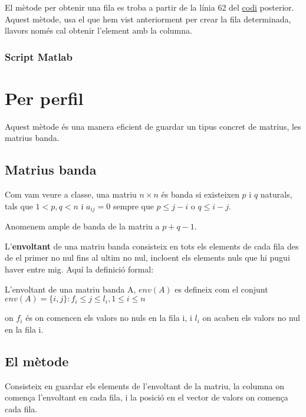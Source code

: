 \documentclass[11pt,a4paper,twoside]{report}
\begin{document}
	El mètode per obtenir una fila es troba a partir de la línia 62 del \hyperref[sec:codi1]{codi} posterior. Aquest mètode, usa el que hem vist anteriorment per crear la fila determinada, llavors només cal obtenir l'element amb la columna.
	
	
	\subsubsection{Script Matlab}
	\label{sec:codi1}
	
	
	
	
	\section{Per perfil}
	
	 
	 Aquest mètode és una manera eficient de guardar un tipus concret de matrius, les matrius banda.
	 
	\subsection{Matrius banda}	 
	
	Com vam veure a classe, 
	una matriu $n \times n$ és banda si existeixen $p$ i $q$ naturals, tals que $1< p, q < n$  i $a_{i j} = 0$ sempre que $p \leq j - i$ o $q \leq i-j$. 
	
	Anomenem ample de banda de la matriu a $p + q - 1$.
	
	L'\textbf{envoltant} de una matriu banda consisteix en tots els elements de cada fila des de el primer no nul fins al ultim no nul, incloent els elements nuls que hi pugui haver entre mig.  Aquí la definició formal:
	
	L'envoltant de una matriu banda A, $env(A)$ es defineix com el conjunt $env(A) = \{i, j\} : f_i \leq j \leq l_i, 1 \leq i \leq n $ 
	
	on $f_i$ és on comencen els valors no nuls en la fila i, i $l_i$ on acaben els valors no nul en la fila i.
	
	

	 \subsection{El mètode}
	 
	 Consisteix en guardar els elements de l'envoltant de la matriu, la columna on comença l'envoltant en cada fila, i la posició en el vector de valors on comença cada fila.
	 
\end{document}
